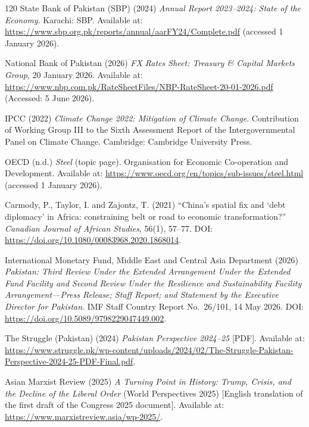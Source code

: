 \begin{singlespace}
\begin{thebibliography}{120}
State Bank of Pakistan (SBP) (2024) \emph{Annual Report 2023--2024: State of the Economy}.
Karachi: SBP. Available at: \url{https://www.sbp.org.pk/reports/annual/aarFY24/Complete.pdf} (accessed 1 January 2026).

National Bank of Pakistan (2026) \emph{FX Rates Sheet: Treasury \& Capital Markets Group},
20 January 2026.
Available at:
\url{https://www.nbp.com.pk/RateSheetFiles/NBP-RateSheet-20-01-2026.pdf}
(Accessed: 5 June 2026).

IPCC (2022) \emph{Climate Change 2022: Mitigation of Climate Change}.
Contribution of Working Group III to the Sixth Assessment Report of the Intergovernmental Panel on Climate Change.
Cambridge: Cambridge University Press.

OECD (n.d.) \emph{Steel} (topic page). Organisation for Economic Co-operation and Development.
Available at: \url{https://www.oecd.org/en/topics/sub-issues/steel.html} (accessed 1 January 2026).

Carmody, P., Taylor, I. and Zajontz, T. (2021) ``China's spatial fix and `debt diplomacy' in Africa: constraining belt or road to economic transformation?'' \emph{Canadian Journal of African Studies}, 56(1), 57--77. DOI: \url{https://doi.org/10.1080/00083968.2020.1868014}.

International Monetary Fund, Middle East and Central Asia Department (2026)
\emph{Pakistan: Third Review Under the Extended Arrangement Under the Extended
Fund Facility and Second Review Under the Resilience and Sustainability Facility
Arrangement---Press Release; Staff Report; and Statement by the Executive
Director for Pakistan}.
IMF Staff Country Report No.~26/101, 14 May 2026.
DOI: \url{https://doi.org/10.5089/9798229047449.002}.


The Struggle (Pakistan) (2024) \emph{Pakistan Perspective 2024--25} [PDF].
Available at: \url{https://www.struggle.pk/wp-content/uploads/2024/02/The-Struggle-Pakistan-Perspective-2024-25-PDF-Final.pdf}.

Asian Marxist Review (2025) \emph{A Turning Point in History: Trump, Crisis, and the Decline of the Liberal Order} (World Perspectives 2025) [English translation of the first draft of the Congress 2025 document].
Available at: \url{https://www.marxistreview.asia/wp-2025/}.

\end{thebibliography}

\end{singlespace}
